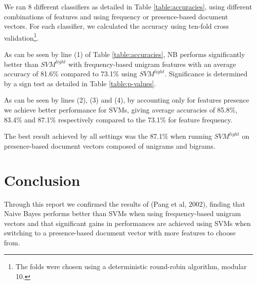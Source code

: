 \documentclass[12pt]{article}
\begin{document}
\begin{multicols}{2}
We ran 8 different classifiers as detailed in Table \ref{table:accuracies}, using different combinations of features and using frequency or presence-based document vectors. For each classifier, we calculated the accuracy using ten-fold cross validation\footnote{The folds were chosen using a deterministic round-robin algorithm, modular 10.}.

As can be seen by line (1) of Table \ref{table:accuracies}, NB performs significantly better than $SVM^{light}$ with frequency-based unigram features with an average accuracy of 81.6\% compared to 73.1\% using $SVM^{light}$. Significance is determined by a sign test as detailed in Table \ref{table:p-values}.

As can be seen by lines (2), (3) and (4), by accounting only for features presence we achieve better performance for SVMs, giving average accuracies of 85.8\%, 83.4\% and 87.1\% respectively compared to the 73.1\%  for feature frequency.

The best result achieved by all settings was the 87.1\% when running $SVM^{light}$ on presence-based document vectors composed of unigrams and bigrams.

\section*{Conclusion}

Through this report we confirmed the results of (Pang et al, 2002), finding that Naive Bayes performs better than SVMs when using frequency-based unigram vectors and that significant gains in performances are achieved using SVMs when switching to a presence-based document vector with more features to choose from.

\end{multicols}
\end{document}

